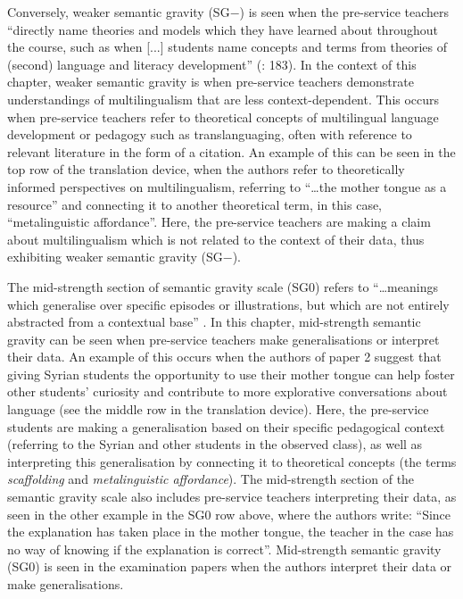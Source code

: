 \documentclass[output=paper]{langscibook}
\begin{document}
Conversely, weaker semantic gravity (SG$-$) is seen when the pre-service teachers “directly name theories and models which they have learned about throughout the course, such as when [...] students name concepts and terms from theories of (second) language and literacy development” (\citealt{Meidell_sigsgaard2021}: 183). In the context of this chapter, weaker semantic gravity is when pre-service teachers demonstrate understandings of multilingualism that are less context-dependent. This occurs when pre-service teachers refer to theoretical concepts of multilingual language development or pedagogy such as translanguaging, often with reference to relevant literature in the form of a citation. An example of this can be seen in the top row of the translation device, when the authors refer to theoretically informed perspectives on multilingualism, referring to “…the mother tongue as a resource” and connecting it to another theoretical term, in this case, “metalinguistic affordance”. Here, the pre-service teachers are making a claim about multilingualism which is not related to the context of their data, thus exhibiting weaker semantic gravity (SG−).

The mid-strength section of semantic gravity scale (SG0) refers to “…meanings which generalise over specific episodes or illustrations, but which are not entirely abstracted from a contextual base” \citep[4]{Kirk2017}. In this chapter, mid-strength semantic gravity can be seen when pre-service teachers make generalisations or interpret their data. An example of this occurs when the authors of paper 2 suggest that giving Syrian students the opportunity to use their mother tongue can help foster other students’ curiosity and contribute to more explorative conversations about language (see the middle row in the translation device). Here, the pre-service students are making a generalisation based on their specific pedagogical context (referring to the Syrian and other students in the observed class), as well as interpreting this generalisation by connecting it to theoretical concepts (the terms \textit{scaffolding} and \textit{metalinguistic affordance}). The mid-strength section of the semantic gravity scale also includes pre-service teachers interpreting their data, as seen in the other example in the SG0 row above, where the authors write: “Since the explanation has taken place in the mother tongue, the teacher in the case has no way of knowing if the explanation is correct”. Mid-strength semantic gravity (SG0) is seen in the examination papers when the authors interpret their data or make generalisations.
\end{document}
